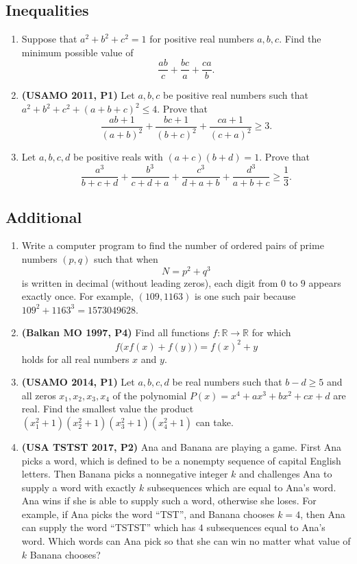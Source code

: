 \documentclass[12pt]{article}
\newcommand{\cmark}{\textcolor{color5}{\ding{51}}} %
\newcommand{\xmark}{\textcolor{color6}{\ding{55}}}   %
\begin{document}
    \subsection{Inequalities}
      \begin{enumerate}[label=\textbf{B.\arabic*.}]
        \item \cmark \quad Suppose that $a^2 + b^2 + c^2 = 1$ for positive real numbers $a, b, c$. Find the minimum possible value of
          \[
            \frac{ab}{c} + \frac{bc}{a} + \frac{ca}{b}.
          \]
        \item \textbf{\textcolor{color2}{(USAMO 2011, P1)}} \cmark \quad Let $a, b, c$ be positive real numbers such that $a^2 + b^2 + c^2 + (a+b+c)^2 \le 4$. Prove that
          \[
            \frac{ab + 1}{(a+b)^2} + \frac{bc + 1}{(b+c)^2} + \frac{ca + 1}{(c+a)^2} \ge 3.
          \]
        \item \cmark \quad Let $a, b, c, d$ be positive reals with $(a+c)(b+d) = 1$. Prove that
          \[
            \frac{a^3}{b+c+d} + \frac{b^3}{c+d+a} + \frac{c^3}{d+a+b} + \frac{d^3}{a+b+c} \ge \frac13.
          \]
      \end{enumerate}
    \subsection{Additional}
      \begin{enumerate}[label=\textbf{C.\arabic*.}]
        \item \xmark \quad Write a computer program to find the number of ordered pairs of prime numbers $(p,q)$ such that when
          \[
            N = p^2 + q^3
          \]
          is written in decimal (without leading zeros), each digit from $0$ to $9$ appears exactly once. For example, $(109,1163)$ is one
          such pair because $109^2 + 1163^3 = 1573049628$.
        \item \textbf{\textcolor{color2}{(Balkan MO 1997, P4)}} \xmark \quad Find all functions $f:\mathbb{R}\to\mathbb{R}$ for which
          \[
            f\big(xf(x)+f(y)\big)=f(x)^2+y
          \]
          holds for all real numbers $x$ and $y$.
        \item \textbf{\textcolor{color2}{(USAMO 2014, P1)}} \xmark \quad Let $a,b,c,d$ be real numbers such that $b-d\ge 5$ and all zeros $x_1,x_2,x_3,x_4$ of the polynomial $P(x)=x^4+ax^3+bx^2+cx+d$ are 
          real. Find the smallest value the product $(x_1^2+1)(x_2^2+1)(x_3^2+1)(x_4^2+1)$ can take.
        \item \textbf{\textcolor{color2}{(USA TSTST 2017, P2)}} \xmark \quad Ana and Banana are playing a game. First Ana picks a word, which is defined to be a nonempty sequence of capital English
          letters. Then Banana picks a nonnegative integer $k$ and challenges Ana to supply a word with exactly $k$ subsequences which are 
          equal to Ana's word. Ana wins if she is able to supply such a word, otherwise she loses. For example, if Ana picks the word “TST”,
          and Banana chooses $k=4$, then Ana can supply the word “TSTST” which has $4$ subsequences equal to Ana's word. Which words can Ana 
          pick so that she can win no matter what value of $k$ Banana chooses?
      \end{enumerate}
\end{document}
